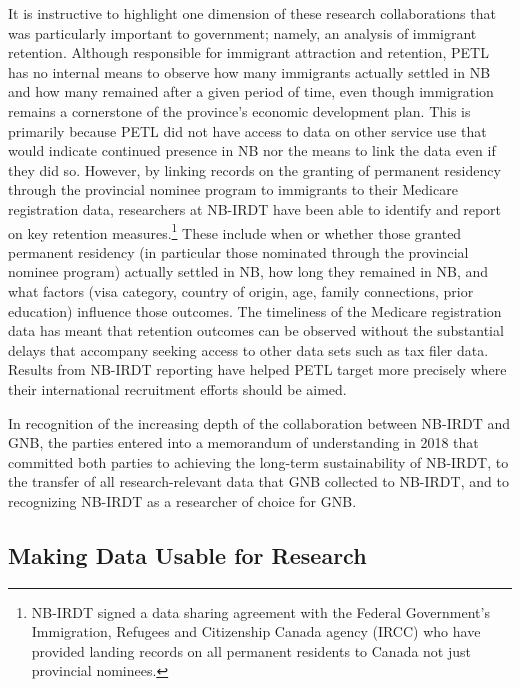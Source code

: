 \documentclass[
]{WileySix}
\begin{document}
It is instructive to highlight one dimension of these research collaborations that was particularly important to government; namely, an analysis of immigrant retention. Although responsible for immigrant attraction and retention, PETL has no internal means to observe how many immigrants actually settled in NB and how many remained after a given period of time, even though immigration remains a cornerstone of the province's economic development plan. This is primarily because PETL did not have access to data on other service use that would indicate continued presence in NB nor the means to link the data even if they did so. However, by linking records on the granting of permanent residency through the provincial nominee program to immigrants to their Medicare registration data, researchers at NB-IRDT have been able to identify and report on key retention measures.\footnote{NB-IRDT signed a data sharing agreement with the Federal Government's Immigration, Refugees and Citizenship Canada agency (IRCC) who have provided landing records on all permanent residents to Canada not just provincial nominees.} These include when or whether those granted permanent residency (in particular those nominated through the provincial nominee program) actually settled in NB, how long they remained in NB, and what factors (visa category, country of origin, age, family connections, prior education) influence those outcomes. The timeliness of the Medicare registration data has meant that retention outcomes can be observed without the substantial delays that accompany seeking access to other data sets such as tax filer data. Results from NB-IRDT reporting have helped PETL target more precisely where their international recruitment efforts should be aimed.

In recognition of the increasing depth of the collaboration between NB-IRDT and GNB, the parties entered into a memorandum of understanding in 2018 that committed both parties to achieving the long-term sustainability of NB-IRDT, to the transfer of all research-relevant data that GNB collected to NB-IRDT, and to recognizing NB-IRDT as a researcher of choice for GNB.

\hypertarget{making-data-usable-for-research-2}{%
\subsection{Making Data Usable for Research}\label{making-data-usable-for-research-2}}
\end{document}
